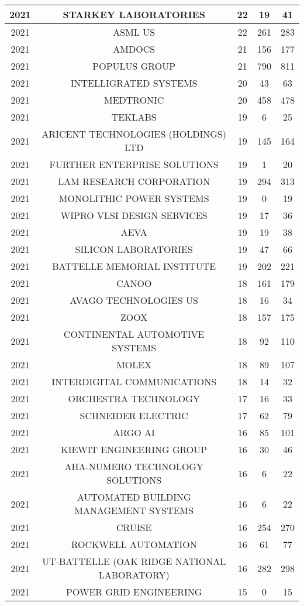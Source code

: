 \documentclass{article}%
\begin{document}
\begin{longtable}{c|c|c|c|c}
\hline%
2021&STARKEY LABORATORIES&22&19&41\\%
\hline%
2021&ASML US&22&261&283\\%
\hline%
2021&AMDOCS&21&156&177\\%
\hline%
2021&POPULUS GROUP&21&790&811\\%
\hline%
2021&INTELLIGRATED SYSTEMS&20&43&63\\%
\hline%
2021&MEDTRONIC&20&458&478\\%
\hline%
2021&TEKLABS&19&6&25\\%
\hline%
2021&ARICENT TECHNOLOGIES (HOLDINGS) LTD&19&145&164\\%
\hline%
2021&FURTHER ENTERPRISE SOLUTIONS&19&1&20\\%
\hline%
2021&LAM RESEARCH CORPORATION&19&294&313\\%
\hline%
2021&MONOLITHIC POWER SYSTEMS&19&0&19\\%
\hline%
2021&WIPRO VLSI DESIGN SERVICES&19&17&36\\%
\hline%
2021&AEVA&19&19&38\\%
\hline%
2021&SILICON LABORATORIES&19&47&66\\%
\hline%
2021&BATTELLE MEMORIAL INSTITUTE&19&202&221\\%
\hline%
2021&CANOO&18&161&179\\%
\hline%
2021&AVAGO TECHNOLOGIES US&18&16&34\\%
\hline%
2021&ZOOX&18&157&175\\%
\hline%
2021&CONTINENTAL AUTOMOTIVE SYSTEMS&18&92&110\\%
\hline%
2021&MOLEX&18&89&107\\%
\hline%
2021&INTERDIGITAL COMMUNICATIONS&18&14&32\\%
\hline%
2021&ORCHESTRA TECHNOLOGY&17&16&33\\%
\hline%
2021&SCHNEIDER ELECTRIC&17&62&79\\%
\hline%
2021&ARGO AI&16&85&101\\%
\hline%
2021&KIEWIT ENGINEERING GROUP&16&30&46\\%
\hline%
2021&AHA{-}NUMERO TECHNOLOGY SOLUTIONS&16&6&22\\%
\hline%
2021&AUTOMATED BUILDING MANAGEMENT SYSTEMS&16&6&22\\%
\hline%
2021&CRUISE&16&254&270\\%
\hline%
2021&ROCKWELL AUTOMATION&16&61&77\\%
\hline%
2021&UT{-}BATTELLE  (OAK RIDGE NATIONAL LABORATORY)&16&282&298\\%
\hline%
2021&POWER GRID ENGINEERING&15&0&15\\%

\end{longtable}
\end{document}
